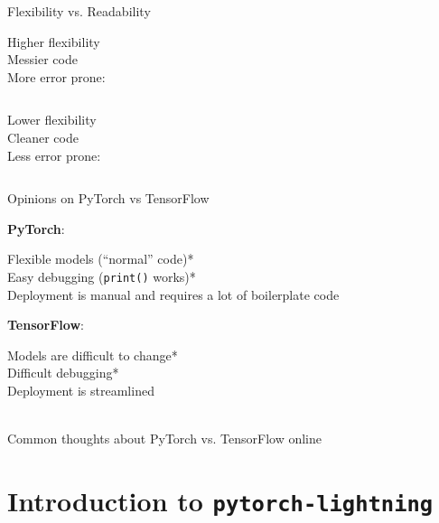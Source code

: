 \documentclass[aspectratio=169]{beamer}
\begin{document}
	\begin{frame}{Flexibility vs. Readability}
		\begin{minipage}[b]{0.45\textwidth}
			Higher flexibility\\
			Messier code\\
			More error prone:\\[1em]

			\inputminted[firstline=4, lastline=7, python3=true]{python}{
			../boilerplate-example-finished.py}
		\end{minipage}\hfill
		\begin{minipage}[b]{0.45\textwidth}
			Lower flexibility\\
			Cleaner code\\
			Less error prone:\\[1em]

			\inputminted[firstline=11, lastline=14, python3=true]{python}{
			../boilerplate-example-finished.py}
		\end{minipage}
	\end{frame}

	\begin{frame}{Opinions on PyTorch vs TensorFlow}
		\vfill
		\begin{minipage}[t]{0.45\textwidth}
			\textbf{PyTorch}:\\\small

			Flexible models (``normal'' code)*\\
			Easy debugging (\texttt{print()} works)*\\

			\alert<2>{Deployment is manual} and requires a lot of boilerplate code
		\end{minipage}\hfill
		\begin{minipage}[t]{0.45\textwidth}
			\textbf{TensorFlow}:\\\small

			Models are difficult to change*\\
			Difficult debugging*\\

			\alert<2>{Deployment is streamlined}
		\end{minipage}\\[5em]
		\centering \tiny *Common thoughts about PyTorch vs. TensorFlow online
	\end{frame}

	\section{Introduction to \texttt{pytorch-lightning}}
\end{document}
